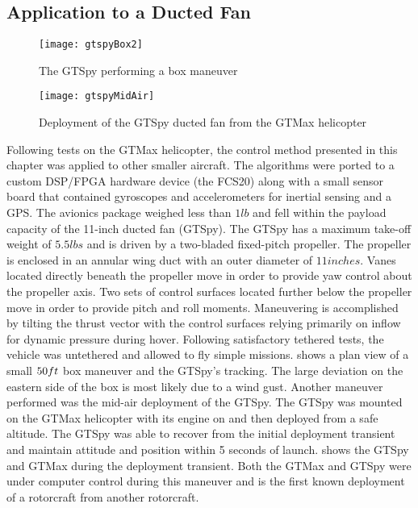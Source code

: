 \subsection{Application to a Ducted Fan}
\begin{figure}
  \begin{center}
  \texttt{[image: gtspyBox2]}
  \caption{The GTSpy performing a box maneuver}
  \label{f:gtspyBox}
  \end{center}
\end{figure}
%
\begin{figure}[h]
  \begin{center}
  \texttt{[image: gtspyMidAir]}
  \caption{Deployment of the GTSpy ducted fan from the GTMax helicopter}
  \label{f:gtspyMidAir}
  \end{center}
\end{figure}
Following tests on the GTMax helicopter, the control method
presented in this chapter was applied to other smaller aircraft. The
algorithms were ported to a custom DSP/FPGA hardware device (the
FCS20) along with a small sensor board that contained gyroscopes and
accelerometers for inertial sensing and a GPS. The avionics package
weighed less than $1 lb$ and fell within the payload capacity of the
11-inch ducted fan (GTSpy). The GTSpy has a maximum take-off weight
of $5.5 lbs$ and is driven by a two-bladed fixed-pitch propeller.
The propeller is enclosed in an annular wing duct with an outer
diameter of $11 inches$. Vanes located directly beneath the
propeller move in order to provide yaw control about the propeller
axis. Two sets of control surfaces located further below the
propeller move in order to provide pitch and roll moments.
Maneuvering is accomplished by tilting the thrust vector with the
control surfaces relying primarily on inflow for dynamic pressure
during hover. Following satisfactory tethered tests, the vehicle was
untethered and allowed to fly simple missions. 
shows a plan view of a small $50\time50 ft$ box maneuver and the
GTSpy's tracking. The large deviation on the eastern side of the box
is most likely due to a wind gust. Another maneuver performed was
the mid-air deployment of the GTSpy. The GTSpy was mounted on the
GTMax helicopter with its engine on and then deployed from a safe
altitude. The GTSpy was able to recover from the initial deployment
transient and maintain attitude and position within 5 seconds of
launch.  shows the GTSpy and GTMax during the
deployment transient. Both the GTMax and GTSpy were under computer
control during this maneuver and is the first known deployment of a
rotorcraft from another rotorcraft.
%


